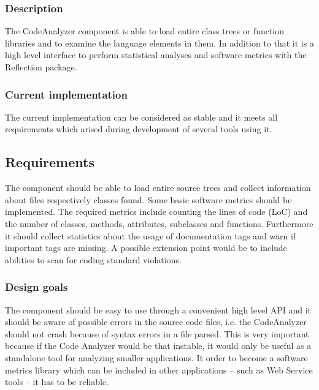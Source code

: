 \documentclass[10pt,final,a4paper,oneside]{article}
\begin{document}
\subsubsection{Description}
The CodeAnalyzer component is able to load entire class trees
or function libraries
and to examine the language elements in them.
In addition to that it is a high level interface to
perform statistical analyses and software metrics with
the Reflection package.

\subsubsection{Current implementation}
The current implementation can be considered as stable
and it meets all requirements which arised during
development of several tools using it.

\subsection{Requirements}\label{subsec:CodeAnalyzerRequirements}
The component should be able to load entire source trees
and collect information about files respectively classes found.
Some basic software metrics should be implemented.
The required metrics include
counting the lines of code (LoC) and the number of
classes, methods, attributes, subclasses and functions.
Furthermore it should collect statistics
about the usage of documentation tags
and warn if important tags are missing.
A possible extension point would be to include abilities
to scan for coding standard violations.

\subsubsection{Design goals}
The component should be easy to use through a convenient high level API
and it should be aware of possible errors in the source code files, i.e.
the CodeAnalyzer should not crash because of syntax errors in a file parsed.
This is very important because if the Code Analyzer would be that instable,
it would only be useful as a standalone tool for analyzing
smaller applications. It order to become a software metrics library
which can be included in other applications -- such as Web Service tools --
it has to be reliable.


\end{document}
